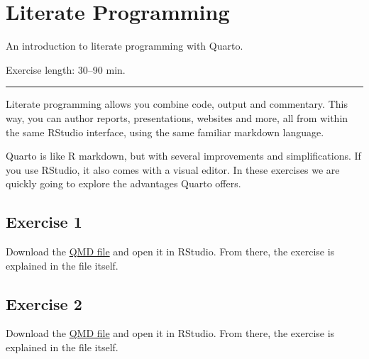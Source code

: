 \documentclass[
]{book}
\begin{document}
\hypertarget{quarto}{%
\chapter{Literate Programming}\label{quarto}}

An introduction to literate programming with Quarto.

Exercise length: 30--90 min.

\begin{center}\rule{0.5\linewidth}{0.5pt}\end{center}

Literate programming allows you combine code, output and commentary. This way, you can author reports, presentations, websites and more, all from within the same RStudio interface, using the same familiar markdown language.

Quarto is like R markdown, but with several improvements and simplifications. If you use RStudio, it also comes with a visual editor. In these exercises we are quickly going to explore the advantages Quarto offers.

\hypertarget{exercise-1}{%
\section{Exercise 1}\label{exercise-1}}

Download the \href{files/Introduction_to_Quarto_1.qmd}{QMD file} and open it in RStudio. From there, the exercise is explained in the file itself.

\hypertarget{exercise-2}{%
\section{Exercise 2}\label{exercise-2}}

Download the \href{files/Introduction_to_Quarto_1.qmd}{QMD file} and open it in RStudio. From there, the exercise is explained in the file itself.
\end{document}
